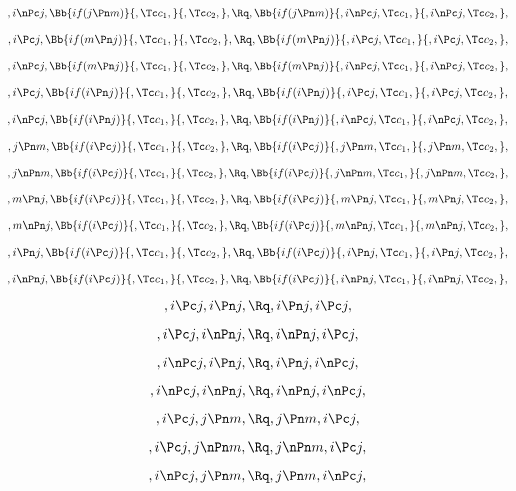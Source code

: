 \bigskip
\bigskip
\[, i \nPc j,\Bb{if(j \Pn m)}{,\Tc c_1,}{,\Tc c_2,}, \Rq , \Bb{if(j \Pn m)}{,i \nPc j, \Tc c_1,}{,i \nPc j, \Tc c_2,},\]

\bigskip
\bigskip
\[, i \Pc j,\Bb{if(m \Pn j)}{,\Tc c_1,}{,\Tc c_2,}, \Rq , \Bb{if(m \Pn j)}{,i \Pc j, \Tc c_1,}{,i \Pc j, \Tc c_2,},\]

\bigskip
\bigskip
\[, i \nPc j,\Bb{if(m \Pn j)}{,\Tc c_1,}{,\Tc c_2,}, \Rq , \Bb{if(m \Pn j)}{,i \nPc j, \Tc c_1,}{,i \nPc j, \Tc c_2,},\]


\bigskip
\bigskip
\[, i \Pc j,\Bb{if(i \Pn j)}{,\Tc c_1,}{,\Tc c_2,}, \Rq , \Bb{if(i \Pn j)}{,i \Pc j, \Tc c_1,}{,i \Pc j, \Tc c_2,},\]

\bigskip
\bigskip
\[, i \nPc j,\Bb{if(i \Pn j)}{,\Tc c_1,}{,\Tc c_2,}, \Rq , \Bb{if(i \Pn j)}{,i \nPc j, \Tc c_1,}{,i \nPc j, \Tc c_2,},\]

\bigskip
\bigskip
\[, j \Pn m,\Bb{if(i \Pc j)}{,\Tc c_1,}{,\Tc c_2,}, \Rq , \Bb{if(i \Pc j)}{,j \Pn m, \Tc c_1,}{,j \Pn m, \Tc c_2,},\]

\bigskip
\bigskip
\[, j \nPn m,\Bb{if(i \Pc j)}{,\Tc c_1,}{,\Tc c_2,}, \Rq , \Bb{if(i \Pc j)}{,j \nPn m, \Tc c_1,}{,j \nPn m, \Tc c_2,},\]

\bigskip
\bigskip
\[, m \Pn j,\Bb{if(i \Pc j)}{,\Tc c_1,}{,\Tc c_2,}, \Rq , \Bb{if(i \Pc j)}{,m \Pn j, \Tc c_1,}{,m \Pn j, \Tc c_2,},\]

\bigskip
\bigskip
\[, m \nPn j,\Bb{if(i \Pc j)}{,\Tc c_1,}{,\Tc c_2,}, \Rq , \Bb{if(i \Pc j)}{,m \nPn j, \Tc c_1,}{,m \nPn j, \Tc c_2,},\]

\bigskip
\bigskip
\[, i \Pn j,\Bb{if(i \Pc j)}{,\Tc c_1,}{,\Tc c_2,}, \Rq , \Bb{if(i \Pc j)}{,i \Pn j, \Tc c_1,}{,i \Pn j, \Tc c_2,},\]

\bigskip
\bigskip
\[, i \nPn j,\Bb{if(i \Pc j)}{,\Tc c_1,}{,\Tc c_2,}, \Rq , \Bb{if(i \Pc j)}{,i \nPn j, \Tc c_1,}{,i \nPn j, \Tc c_2,},\]

\bigskip
\bigskip


\[,i \Pc j, i \Pn j, \Rq , i \Pn j, i \Pc j,\]

\[,i \Pc j, i \nPn j, \Rq , i \nPn j, i \Pc j,\]

\[,i \nPc j, i \Pn j, \Rq , i \Pn j, i \nPc j,\]

\[,i \nPc j, i \nPn j, \Rq , i \nPn j, i \nPc j,\]

\[,i \Pc j, j \Pn m, \Rq , j \Pn m, i \Pc j,\]

\[,i \Pc j, j \nPn m, \Rq , j \nPn m, i \Pc j,\]

\[,i \nPc j, j \Pn m, \Rq , j \Pn m, i \nPc j,\]

